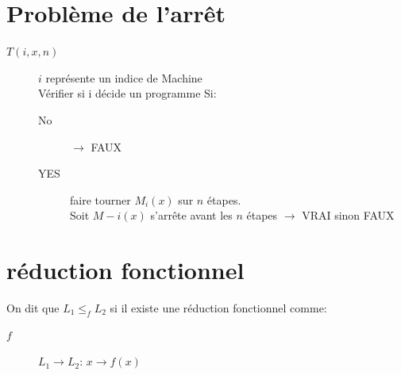 {

\section{Problème de l'arrêt}
\begin{description}
\item[$T(i,x,n)$] $i$ représente un indice de Machine\\ Vérifier si i décide un programme Si:
\begin{description}
\item[No] $\rightarrow$ FAUX
\item[YES] faire tourner $M_i(x)$ sur $n$ étapes.\\
Soit $M-i(x)$ s'arrête avant les $n$ étapes $\rightarrow$ VRAI sinon FAUX
\end{description}
\end{description}

\section{réduction fonctionnel}
On dit que $L_1 \leq_f L_2$ si il existe une réduction fonctionnel comme:
\begin{description}
\item[$f$] $L_1 \rightarrow L_2$: $x \rightarrow f(x)$
\end{description}

}
